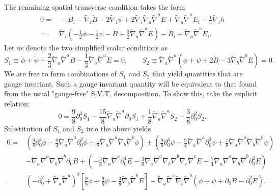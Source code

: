 \documentclass[10pt,letterpaper]{article}
\numberwithin{equation}{subsection}
\begin{document}
The remaining spatial transverse condition takes the form
\begin{align}
0 =&{}- \dot B_i - \tilde\nabla_i \dot B -2\tilde\nabla_i \psi + 2\tilde\nabla_i  \tilde\nabla_a\tilde\nabla^a E +  \tilde\nabla_a\tilde\nabla^a E_i - \frac14 \tilde\nabla_i h
\nonumber\\
=& \tilde\nabla_i\left( -\frac12 \phi - \frac12 \psi - \dot B + \frac32  \tilde\nabla_a\tilde\nabla^a E\right) - \dot B_i +  \tilde\nabla_a\tilde\nabla^a E_i.
\end{align}
Let us denote the two simplified scalar conditions as
\begin{equation}
 S_1 \equiv \dot\phi + \dot\psi + \frac23 \tilde\nabla_a\tilde\nabla^a B - \frac13 \tilde\nabla_a\tilde\nabla^a \dot E =0,
\qquad
S_2 \equiv \tilde\nabla_a\tilde\nabla^a \left( \phi + \psi + 2\dot B - 3\tilde\nabla_b\tilde\nabla^b E\right) =0.
\end{equation}
We are free to form combinations of $S_1$ and $S_2$ that yield quantities that are gauge invariant. Such a gauge invariant quantity will be equivalent to that found from the usual "gauge-free" S.V.T. decomposition. To show this, take the explicit relation:
\begin{equation}
0=\frac98 \partial_0^3 S_1 - \frac{15}{8} \tilde\nabla_a\tilde\nabla^a\partial_0 S_1+\frac{1}{8} \tilde\nabla_a\tilde\nabla^a S_2    -\frac38 \partial_0^2 S_2 .
\end{equation}
Substitution of $S_1$ and $S_2$ into the above yields
\begin{align}
0={}& \left(\frac98 \partial_0^4 \phi - \frac94  \tilde\nabla_a\tilde\nabla^a \partial_0^2 \phi + \frac18  \tilde\nabla_a\tilde\nabla^a \tilde\nabla_b\tilde\nabla^b \phi\right) + \left(\frac98 \partial_0^4 \psi - \frac94  \tilde\nabla_a\tilde\nabla^a \partial_0^2 \psi + \frac18  \tilde\nabla_a\tilde\nabla^a \tilde\nabla_b\tilde\nabla^b \psi\right)
\nonumber\\
& - \tilde\nabla_a\tilde\nabla^a \tilde\nabla_b\tilde\nabla^b \partial_0 B 
+\left( -\frac38 \tilde\nabla_a\tilde\nabla^a \partial_0^4 E - \frac38 \tilde\nabla_a\tilde\nabla^a \tilde\nabla_b\tilde\nabla^b\tilde\nabla_c\tilde\nabla^c E + \frac74
\tilde\nabla_a\tilde\nabla^a \tilde\nabla_b\tilde\nabla^b\partial_0^2 E\right)
\nonumber\\
={}&\left(-\partial_0^2+\tilde\nabla_a\tilde\nabla^a\right)^2
\left[ \frac98 \phi + \frac98\psi  -\frac38 \tilde\nabla_b\tilde\nabla^b E \right]
 -\tilde\nabla_a\tilde\nabla^a \tilde\nabla_b\tilde\nabla^b\left( \phi + \psi +\partial_0 B - \partial_0^2 E\right).
\end{align}
\end{document}

